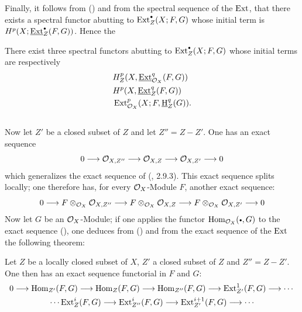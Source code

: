 Finally, it follows from () and from the spectral sequence of the $\operatorname{Ext}$, that there exists a spectral functor abutting to $\Ext^{\boule}_Z(X;F, G)$ whose initial term is $H^p(X;\SheafExt_Z^\boule(F, G))$. Hence the

\setcounter{equation}{0}

\begin{theorem} \label{VI.1.6}
There exist three spectral functors abutting to $\Ext_{Z}^\boule(X;F, G)$ whose initial terms are respectively
\begin{align}
\label{VI.1.6.1} &H_Z^p(X, \operatorname{\underline{Ext}}_{\mathcal{O}_X}^q(F, G))\\
\label{VI.1.6.2} &H^p(X, \operatorname{\underline{Ext}}_Z^q(F, G))\\
\label{VI.1.6.3} &\operatorname{Ext}_{\mathcal{O}_X}^p(X;F, \operatorname{\underline{H}}_Z^q(G)).
\end{align}
\end{theorem}

\subsection{} \label{VI.1.7}
Now let $Z'$ be a closed subset of $Z$ and let $Z''=Z {-} Z'$. One has an exact sequence
\setcounter{equation}{0}
\begin{equation} \label{VI.1.7.1}
0 \to \Oo_{X, Z''} \to \Oo_{X, Z} \to \Oo_{X, Z'} \to 0
\end{equation}
which generalizes the exact sequence of (\cite{Godement}, 2.9.3). This exact sequence splits locally; one therefore has, for every $\mathcal{O}_X$-Module $F$, another exact sequence:
\begin{equation} \label{VI.1.7.2} {0 \to F \otimes_{\OX} \Oo_{X, Z''} \to F \otimes_{\OX} \Oo_{X, Z} \to F \otimes_{\OX} \Oo_{X, Z'} \to 0}
\end{equation}
Now let $G$ be an $\mathcal{O}_X$-Module; if one applies the functor $\Hom_{\OX}(\boule, G)$ to the exact sequence (), one deduces from () and from the exact sequence of the $\operatorname{Ext}$ the following theorem:

\begin{theorem} \label{VI.1.8}
Let $Z$ be a locally closed subset of $X$, $Z'$ a closed subset of $Z$ and $Z''=Z{-} Z'$. One then has an exact sequence functorial in $F$ and $G$:
\begin{gather*}
0 \to \Hom_{Z'}(F, G) \to \Hom_Z(F, G) \to \Hom_{Z''}(F, G)\to \Ext_{{Z'}}^1(F, G) \to \cdots{}\\
{}\cdots \Ext_{Z}^i(F, G) \to \Ext_{{Z''}}^i(F, G) \to \Ext_{{Z'}}^{i+1}(F, G) \to \cdots{}
\end{gather*}
\end{theorem}

